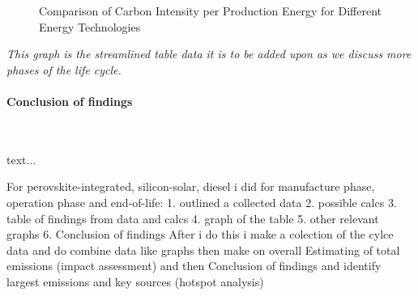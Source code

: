 \documentclass{article}
\begin{document}
\begin{figure}[H]
	\centering
	\caption{Comparison of Carbon Intensity per Production Energy for Different Energy Technologies}
	\label{fig:carbon_intensity}
\end{figure}
\vspace{-1em}
\textit{This graph is the streamlined table data it is to be added upon as we discuss more phases of the life cycle.}

\paragraph{Conclusion of findings}\mbox{}\\[-6pt]\noindent

text...

\newpage

\begin{tcolorbox}[title={\subsubsection{Operational Phase}\vspace{-1em}}, colback=white, colframe=green!50!black, boxrule=1mm, width=1\textwidth]

\end{tcolorbox}


For perovskite-integrated, silicon-solar, diesel
i did for manufacture phase, operation phase and end-of-life:
1. outlined a collected data
2. possible calcs
3. table of findings from data and calcs
4. graph of the table
5. other relevant graphs
6. Conclusion of findings
After i do this i make a colection of the cylce data and do combine data like graphs then make on overall  Estimating of total emissions (impact assessment) and then Conclusion of findings and identify largest emissions and key sources (hotspot analysis)	
\end{document}
